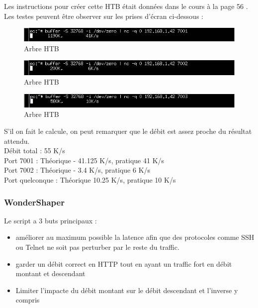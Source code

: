 \documentclass{article}
\begin{document}
Les instructions pour créer cette HTB était données dans le cours à la page 56 \cite{doc-labo}. \\

Les testes peuvent être observer sur les prises d'écran ci-dessous : 

\begin{figure}[h]
	\centering
	\includegraphics{./captures/htb1.png}
	\caption{Arbre HTB}
	\label{fig:Débit port 7001}
\end{figure}
\begin{figure}[h]
	\centering
	\includegraphics{./captures/htb2.png}
	\caption{Arbre HTB}
	\label{fig:Débit port 7002}
\end{figure}
\begin{figure}[h]
	\centering
	\includegraphics{./captures/htb3.png}
	\caption{Arbre HTB}
	\label{fig:Débit port 7003}
\end{figure}
\newpage

S'il on fait le calcule, on peut remarquer que le débit est assez proche du résultat attendu. \\

Débit total : 55 K/s\\
Port 7001 : Théorique - 41.125 K/s, pratique 41 K/s\\
Port 7002 : Théorique - 3.4 K/s, pratique 6 K/s\\
Port quelconque : Théorique 10.25 K/s, pratique 10 K/s

\subsubsection{WonderShaper}

Le script a 3 buts principaux : \\

\begin{itemize}
	\item améliorer au maximum possible la latence afin que des protocoles comme SSH ou Telnet ne soit pas perturber par le reste du traffic.
	\item garder un débit correct en HTTP tout en ayant un traffic fort en débit montant et descendant
	\item Limiter l'impacte du débit montant sur le débit descendant et l'inverse y compris
\end{itemize}
\end{document}
